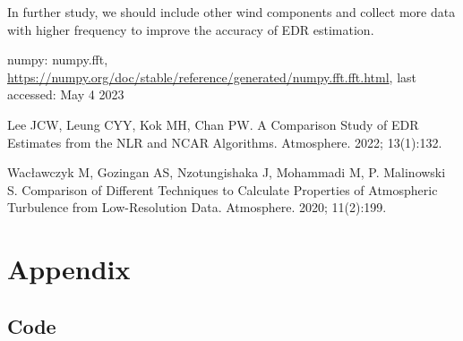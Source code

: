 \documentclass[runningheads]{llncs}
\begin{document}
In further study, we should include other wind components and collect more data with higher frequency to improve the accuracy of EDR estimation.

\begin{thebibliography}{8}
    numpy: numpy.fft, \url{https://numpy.org/doc/stable/reference/generated/numpy.fft.fft.html}, last accessed: May 4 2023
    
    Lee JCW, Leung CYY, Kok MH, Chan PW. A Comparison Study of EDR Estimates from the NLR and NCAR Algorithms. Atmosphere. 2022; 13(1):132. 

    Wacławczyk M, Gozingan AS, Nzotungishaka J, Mohammadi M, P. Malinowski S. Comparison of Different Techniques to Calculate Properties of Atmospheric Turbulence from Low-Resolution Data. Atmosphere. 2020; 11(2):199.
\end{thebibliography}

\newpage
\section*{Appendix}
\subsection*{Code}


\end{document}
